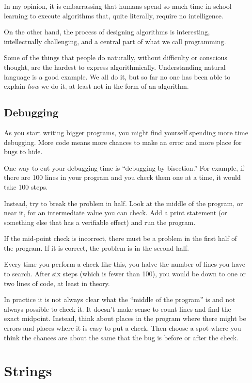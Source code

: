 \documentclass{article}
\begin{document}
In my opinion, it is embarrassing that humans spend so much time in school
learning to execute algorithms that, quite literally, require no
intelligence.

On the other hand, the process of designing algorithms is interesting,
intellectually challenging, and a central part of what we call programming.

Some of the things that people do naturally, without difficulty or
conscious thought, are the hardest to express algorithmically.
Understanding natural language is a good example. We all do it, but so far
no one has been able to explain \emph{how} we do it, at least not in the form of
an algorithm.

\subsection{Debugging}
As you start writing bigger programs, you might find yourself spending more
time debugging. More code means more chances to make an error and more
place for bugs to hide.

One way to cut your debugging time is “debugging by bisection.” For
example, if there are 100 lines in your program and you check them one at a
time, it would take 100 steps.

Instead, try to break the problem in half. Look at the middle of the
program, or near it, for an intermediate value you can check. Add a print
statement (or something else that has a verifiable effect) and run the
program.

If the mid-point check is incorrect, there must be a problem in the first
half of the program. If it is correct, the problem is in the second half.

Every time you perform a check like this, you halve the number of lines you
have to search. After six steps (which is fewer than 100), you would be
down to one or two lines of code, at least in theory.

In practice it is not always clear what the “middle of the program” is and
not always possible to check it. It doesn’t make sense to count lines and
find the exact midpoint. Instead, think about places in the program where
there might be errors and places where it is easy to put a check. Then
choose a spot where you think the chances are about the same that the bug
is before or after the check.

\newpage  %
\section{Strings}
\end{document}
